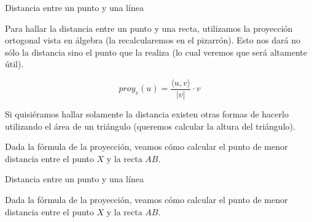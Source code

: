 \documentclass[compress]{beamer}
\newcommand{\bigpause}{\bigskip \pause}
\begin{document}
\begin{frame}{Distancia entre un punto y una línea}

Para hallar la distancia entre un punto y una recta, utilizamos la proyección
ortogonal vista en álgebra (la recalcularemos en el pizarrón). Esto nos
dará no sólo la distancia sino el punto que la realiza (lo cual veremos que
será altamente útil).

$$proy_v(u) = \displaystyle \frac{\langle u,v \rangle}{|v|} \cdot v$$

Si quisiéramos hallar solamente la distancia existen
otras formas de hacerlo utilizando el área de un triángulo (queremos calcular
la altura del triángulo).

\bigskip

Dada la fórmula de la proyección, veamos cómo calcular el punto de menor
distancia entre el punto $X$ y la recta $AB$.
\end{frame}

\begin{frame}{Distancia entre un punto y una línea}

\small

Dada la fórmula de la proyección, veamos cómo calcular el punto de menor
distancia entre el punto $X$ y la recta $AB$.
\bigpause
{}

\end{frame}
\end{document}
